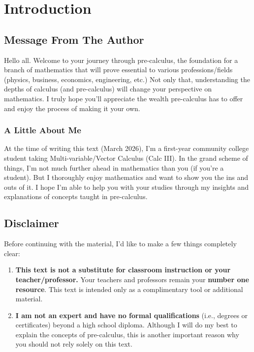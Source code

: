 \chapter*{Introduction}
\vspace{-1.25cm}
\section*{Message From The Author}
Hello all. Welcome to your journey through pre-calculus, the foundation for a branch of mathematics that will prove essential to various professions/fields (physics, business, economics, engineering, etc.) Not only that, understanding the depths of calculus (and pre-calculus) will change your perspective on mathematics. I truly hope you'll appreciate the wealth pre-calculus has to offer and enjoy the process of making it your own.

\subsection*{A Little About Me}
At the time of writing this text (March 2026), I'm a first-year community college student taking Multi-variable/Vector Calculus (Calc III). In the grand scheme of things, I'm not much further ahead in mathematics than you (if you're a student). But I thoroughly enjoy mathematics and want to show you the ins and outs of it. I hope I'm able to help you with your studies through my insights and explanations of concepts taught in pre-calculus.

\section*{Disclaimer}
Before continuing with the material, I'd like to make a few things completely clear:
\begin{enumerate}
    \item \textbf{This text is not a substitute for classroom instruction or your teacher/professor.} Your teachers and professors remain your \textbf{number one resource}. This text is intended only as a complimentary tool or additional material.
    \item \textbf{I am not an expert and have no formal qualifications} (i.e., degrees or certificates) beyond a high school diploma. Although I will do my best to explain the concepts of pre-calculus, this is another important reason why you should not rely solely on this text.
\end{enumerate}